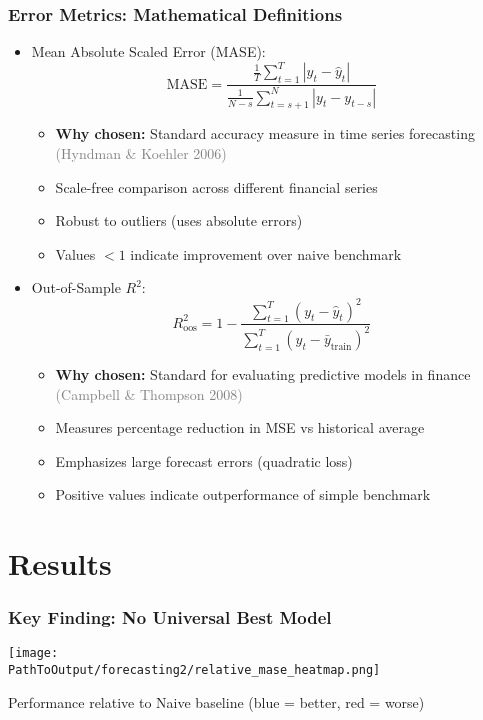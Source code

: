 \documentclass[ignorenonframetext, 9pt]{beamer}
\begin{document}
\begin{frame}
  \frametitle{Error Metrics: Mathematical Definitions}
  \begin{itemize}
  \item \alert{Mean Absolute Scaled Error (MASE):}
  \[
  \mathrm{MASE}=\frac{\frac{1}{T}\sum_{t=1}^T |y_t-\hat y_t|}
  {\displaystyle \frac{1}{N-s}\sum_{t=s+1}^{N} |y_t - y_{t-s}|}
  \]
  \begin{itemize}
    \item \textbf{Why chosen:} Standard accuracy measure in time series forecasting \textcolor{gray}{(Hyndman \& Koehler 2006)}
    \item Scale-free comparison across different financial series
    \item Robust to outliers (uses absolute errors)
    \item Values $<1$ indicate improvement over naive benchmark
  \end{itemize}
  \vspace{0.3cm}
  \item \alert{Out-of-Sample $R^2$:}
  \[
  R^2_{\text{oos}} = 1 - \frac{\sum_{t=1}^T (y_t-\hat y_t)^2}{\sum_{t=1}^T (y_t-\bar{y}_{\text{train}})^2}
  \]
  \begin{itemize}
    \item \textbf{Why chosen:} Standard for evaluating predictive models in finance \textcolor{gray}{(Campbell \& Thompson 2008)}
    \item Measures percentage reduction in MSE vs historical average
    \item Emphasizes large forecast errors (quadratic loss)
    \item Positive values indicate outperformance of simple benchmark
  \end{itemize}
  \end{itemize}
\end{frame}

\section{Results}


\begin{frame}
  \frametitle{Key Finding: No Universal Best Model}
  \centering
  \texttt{[image: \\PathToOutput/forecasting2/relative\_mase\_heatmap.png]}
  \vspace{0.2cm}

  Performance relative to Naive baseline (blue = better, red = worse)
\end{frame}
\end{document}
